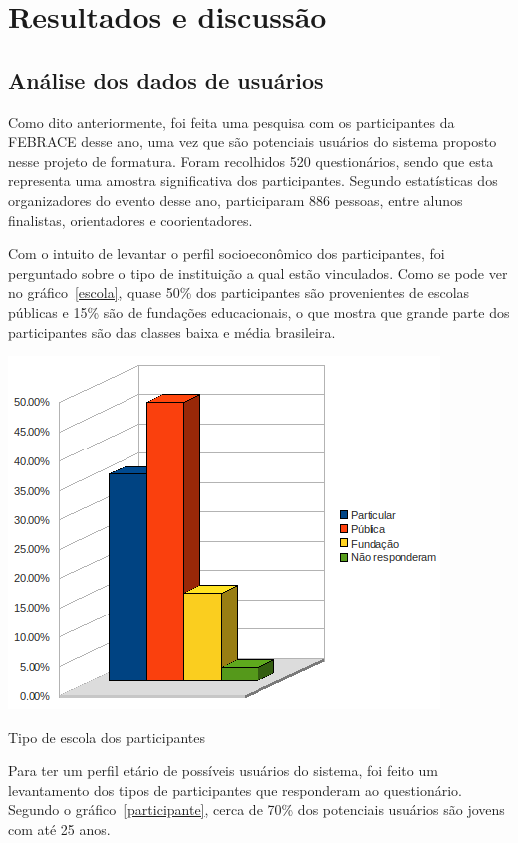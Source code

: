 
\chapter{Resultados e discussão}

\section{Análise dos dados de usuários}

  Como dito anteriormente, foi feita uma pesquisa com os participantes da FEBRACE desse ano, uma vez que são potenciais usuários do sistema proposto
nesse projeto de formatura. Foram recolhidos 520 questionários, sendo que esta representa uma amostra significativa dos participantes. Segundo 
estatísticas dos organizadores do evento desse ano, participaram 886 pessoas, entre alunos finalistas, orientadores e coorientadores.

  Com o intuito de levantar o perfil socioeconômico dos participantes, foi perguntado sobre o tipo de instituição a qual estão vinculados. Como se 
pode ver no gráfico~\ref{escola}, quase 50\% dos participantes são provenientes de escolas públicas e 15\% são de fundações educacionais, o que mostra
que grande parte dos participantes são das classes baixa e média brasileira.

  \begin{grafico}
      \begin{center}
	\includegraphics[width=0.7\linewidth]{arquivos/escola.png}
      \end{center}
      \caption{Tipo de escola dos participantes}
      \label{escola}
  \end{grafico}

  Para ter um perfil etário de possíveis usuários do sistema, foi feito um levantamento dos tipos de participantes que responderam ao questionário. 
Segundo o gráfico~\ref{participante}, cerca de 70\% dos potenciais usuários são jovens com até 25 anos.

